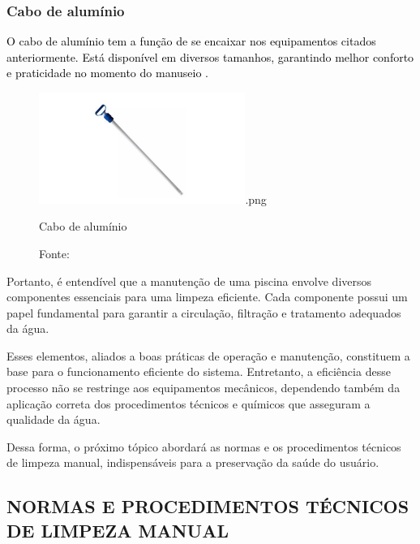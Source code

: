         \subsubsection*{Cabo de alumínio}

         \textcolor{black}{O cabo de alumínio tem a função de se encaixar nos equipamentos citados anteriormente. Está disponível em diversos tamanhos, garantindo melhor conforto e praticidade no momento do manuseio \cite{benedito2024projeto}.}

            \begin{figure}[H]
                \centering
                \caption{ }  
                \centering
                \label{fig:cont}
                \includegraphics[width=0.60\textwidth]{imagens/cabo}.png
                \caption*{Cabo de alumínio}
                \caption*{Fonte: \cite{benedito2024projeto}}
            \end{figure}

        Portanto, é entendível que a manutenção de uma piscina envolve diversos componentes essenciais para uma limpeza eficiente. Cada componente possui um papel fundamental para garantir a circulação, filtração e tratamento adequados da água. 
        
        Esses elementos, aliados a boas práticas de operação e manutenção, constituem a base para o funcionamento eficiente do sistema. Entretanto, a eficiência desse processo não se restringe aos equipamentos mecânicos, dependendo também da aplicação correta dos procedimentos técnicos e químicos que asseguram a qualidade da água.
        
        Dessa forma, o próximo tópico abordará as normas e os procedimentos técnicos de limpeza manual, indispensáveis para a preservação da saúde do usuário.

    \subsection{NORMAS E PROCEDIMENTOS TÉCNICOS DE LIMPEZA MANUAL}

